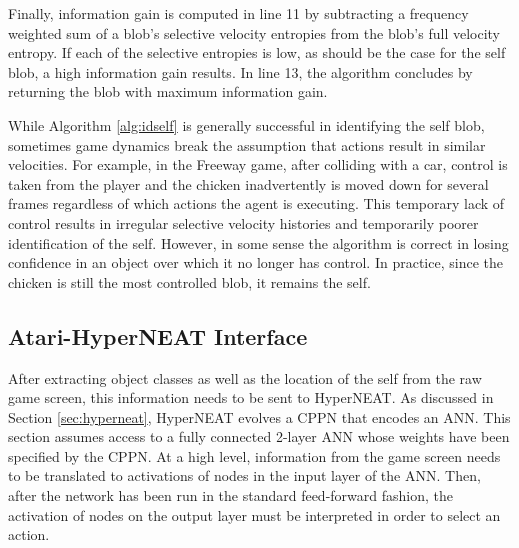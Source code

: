 \documentclass{sig-alternate}
\begin{document}
Finally, information gain is computed in line 11 by subtracting a frequency weighted sum of a blob's selective velocity entropies from the blob's full velocity entropy. If each of the selective entropies is low, as should be the case for the self blob, a high information gain results. In line 13, the algorithm concludes by returning the blob with maximum information gain.

While Algorithm \ref{alg:idself} is generally successful in identifying the self blob, sometimes game dynamics break the assumption that actions result in similar velocities. For example, in the Freeway game, after colliding with a car, control is taken from the player and the chicken inadvertently is moved down for several frames regardless of which actions the agent is executing. This temporary lack of control results in irregular selective velocity histories and temporarily poorer identification of the self. However, in some sense the algorithm is correct in losing confidence in an object over which it no longer has control. In practice, since the chicken is still the most controlled blob, it remains the self.

\subsection{Atari-HyperNEAT Interface}
\label{sec:interface}
After extracting object classes as well as the location of the self from the raw game screen, this information needs to be sent to HyperNEAT. As discussed in Section \ref{sec:hyperneat}, HyperNEAT evolves a CPPN that encodes an ANN. This section assumes access to a fully connected 2-layer ANN whose weights have been specified by the CPPN. At a high level, information from the game screen needs to be translated to activations of nodes in the input layer of the ANN. Then, after the network has been run in the standard feed-forward fashion, the activation of nodes on the output layer must be interpreted in order to select an action.
\end{document}
